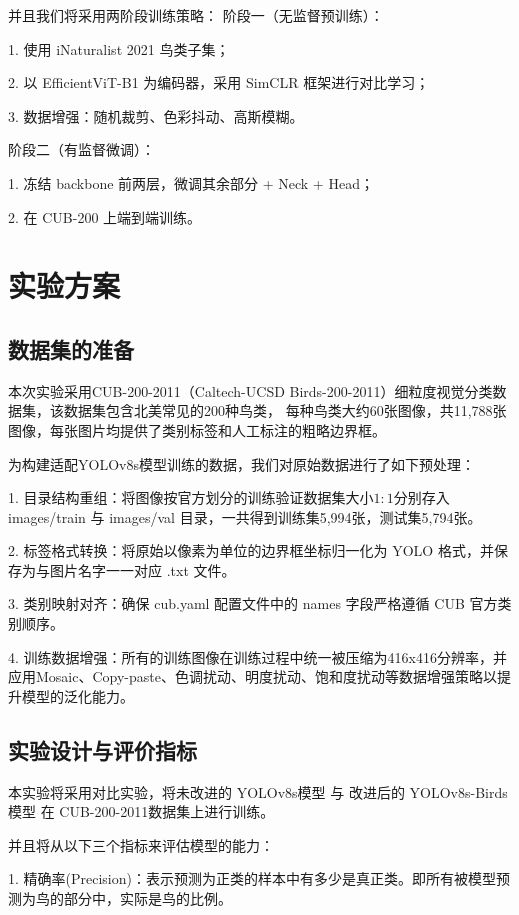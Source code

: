 \documentclass[12pt]{ctexart}
\begin{document}
并且我们将采用两阶段训练策略：
阶段一（无监督预训练）：

1. 使用 iNaturalist 2021 鸟类子集；

2. 以 EfficientViT-B1 为编码器，采用 SimCLR 框架进行对比学习；

3. 数据增强：随机裁剪、色彩抖动、高斯模糊。

阶段二（有监督微调）：

1. 冻结 backbone 前两层，微调其余部分 + Neck + Head；

2. 在 CUB-200 上端到端训练。


\section{实验方案}

\subsection{数据集的准备}
本次实验采用CUB-200-2011（Caltech-UCSD Birds-200-2011）细粒度视觉分类数据集，该数据集包含北美常见的200种鸟类，
每种鸟类大约60张图像，共11,788张图像，每张图片均提供了类别标签和人工标注的粗略边界框。\cite{ref4}

为构建适配YOLOv8s模型训练的数据，我们对原始数据进行了如下预处理：

1. 目录结构重组：将图像按官方划分的训练验证数据集大小$1:1$分别存入 images/train 与 images/val 目录，一共得到训练集5,994张，测试集5,794张。

2. 标签格式转换：将原始以像素为单位的边界框坐标归一化为 YOLO 格式，并保存为与图片名字一一对应 .txt 文件。

3. 类别映射对齐：确保 cub.yaml 配置文件中的 names 字段严格遵循 CUB 官方类别顺序。

4. 训练数据增强：所有的训练图像在训练过程中统一被压缩为416x416分辨率，并应用Mosaic、Copy-paste、色调扰动、明度扰动、饱和度扰动等数据增强策略以提升模型的泛化能力。

\subsection{实验设计与评价指标}

本实验将采用对比实验，将未改进的 YOLOv8s模型 与 改进后的 YOLOv8s-Birds 模型 在 CUB-200-2011数据集上进行训练。



并且将从以下三个指标来评估模型的能力：

1. 精确率(Precision)：表示预测为正类的样本中有多少是真正类。即所有被模型预测为鸟的部分中，实际是鸟的比例。
\end{document}
